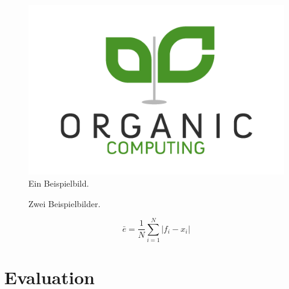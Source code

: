 \documentclass{llncs}
\begin{document}
\begin{figure}[th!]
	\centering
	\includegraphics[width=.8\columnwidth]{./Figures/Organic-Computing.png}
	\caption{Ein Beispielbild.}
	\label{fig:abb1}
\end{figure}


\begin{figure}
	\centering
	\hfill
	\caption{Zwei Beispielbilder.}
\end{figure}

\begin{equation}
\label{eq:mean}
\bar{e} = \frac{1}{N}\sum_{i=1}^N{\lvert f_i - x_i\rvert}
\end{equation}


\section{Evaluation}
\end{document}
